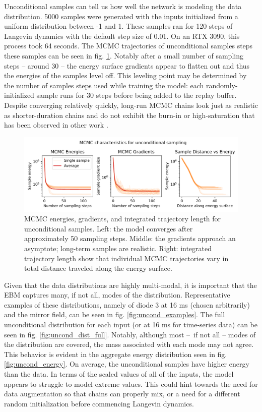 Unconditional samples can tell us how well the network is modeling the data distribution. 5000 samples were generated with the inputs initialized from a uniform distribution between -1 and 1. These samples ran for 120 steps of Langevin dynamics with the default step size of 0.01. On an RTX 3090, this process took 64 seconds. The MCMC trajectories of unconditional samples steps these samples can be seen in fig. \ref{fig:uncond_mcmc}. Notably after a small number of sampling steps -- around 30 -- the energy surface gradients appear to flatten out and thus the energies of the samples level off. This leveling point may be determined by the number of samples steps used while training the model: each randomly-initialized sample runs for 30 steps before being added to the replay buffer. Despite converging relatively quickly, long-run MCMC chains look just as realistic as shorter-duration chains and do not exhibit the burn-in or high-saturation that has been observed in other work \cite{du_implicit_2020}. 

\begin{figure}
	\centering
	\includegraphics[width=\linewidth]{figures/uncond_mcmc_diagnostics_39-0.pdf}
	\caption[MCMC energies, gradients, and integrated trajectory length for unconditional samples]{\label{fig:uncond_mcmc}MCMC energies, gradients, and integrated trajectory length for unconditional samples. Left: the model converges after approximately 50 sampling steps. Middle: the gradients approach an asymptote; long-term samples are realistic. Right: integrated trajectory length show that individual MCMC trajectories vary in total distance traveled along the energy surface.}
\end{figure}

Given that the data distributions are highly multi-modal, it is important that the EBM captures many, if not all, modes of the distribution. Representative examples of these distributions, namely of diode 3 at 16 ms (chosen arbitrarily) and the mirror field, can be seen in fig. \ref{fig:uncond_examples}. The full unconditional distribution for each input (or at 16 ms for time-series data) can be seen in fig. \ref{fig:uncond_dist_full}. Notably, although most -- if not all -- modes of the distribution are covered, the mass associated with each mode may not agree. This behavior is evident in the aggregate energy distribution seen in fig. \ref{fig:uncond_energy}. On average, the unconditional samples have higher energy than the data. In terms of the scaled values of all of the inputs, the model appears to struggle to model extreme values. This could hint towards the need for data augmentation so that chains can properly mix, or a need for a different random initialization before commencing Langevin dynamics.

